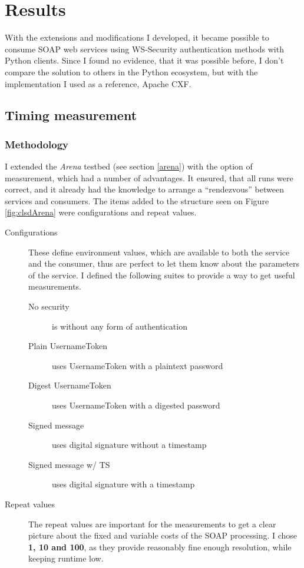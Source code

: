 \chapter{Results}

With the extensions and modifications I developed, it became possible to consume SOAP web services using WS-Security authentication methods with Python clients. Since I found no evidence, that it was possible before, I don't compare the solution to others in the Python ecosystem, but with the implementation I used as a reference, Apache CXF.

\section{Timing measurement}

\subsection{Methodology}

I extended the \emph{Arena} testbed (see section \ref{arena}) with the option of measurement, which had a number of advantages. It ensured, that all runs were correct, and it already had the knowledge to arrange a ``rendezvous'' between services and consumers. The items added to the structure seen on Figure \ref{fig:clsdArena} were configurations and repeat values.

\begin{description}
 \item[Configurations] These define environment values, which are available to both the service and the consumer, thus are perfect to let them know about the parameters of the service. I defined the following suites to provide a way to get useful measurements.
 \begin{description}
  \item[No security] is without any form of authentication
  \item[Plain UsernameToken] uses UsernameToken with a plaintext password
  \item[Digest UsernameToken] uses UsernameToken with a digested password
  \item[Signed message] uses digital signature without a timestamp
  \item[Signed message w/ TS] uses digital signature with a timestamp
 \end{description}
 \item[Repeat values] The repeat values are important for the measurements to get a clear picture about the fixed and variable costs of the SOAP processing. I chose \textbf{1, 10 and 100}, as they provide reasonably fine enough resolution, while keeping runtime low.
\end{description}

